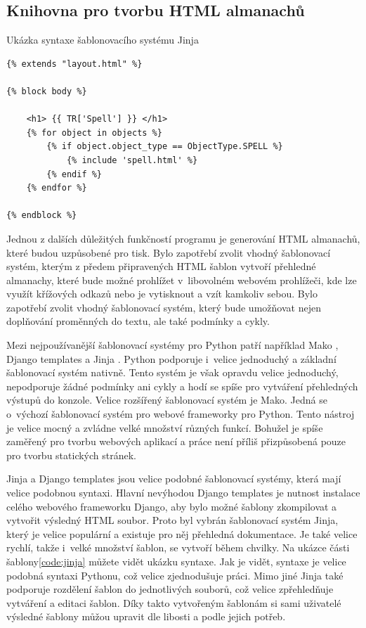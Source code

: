 \documentclass[thesis=B,czech]{resources/FITthesis}[2012/06/26]
\begin{document}
\subsection{Knihovna pro tvorbu HTML almanachů}
\begin{listing}[htbp]
\caption{\label{code:jinja}Ukázka syntaxe šablonovacího systému Jinja}
\begin{verbatim}
{% extends "layout.html" %}

{% block body %}

    <h1> {{ TR['Spell'] }} </h1>
    {% for object in objects %}
        {% if object.object_type == ObjectType.SPELL %}
            {% include 'spell.html' %}
        {% endif %}
    {% endfor %}
    
{% endblock %}

\end{verbatim}
\end{listing}
Jednou z dalších důležitých funkčností programu je generování HTML almanachů, které budou uzpůsobené pro tisk. Bylo zapotřebí zvolit vhodný šablonovací systém, kterým z předem připravených HTML šablon vytvoří přehledné almanachy, které bude možné prohlížet v~libovolném webovém prohlížeči, kde lze využít křížových odkazů nebo je vytisknout a vzít kamkoliv sebou. Bylo zapotřebí zvolit vhodný šablonovací systém, který bude umožňovat nejen doplňování proměnných do textu, ale také podmínky a cykly.\par

Mezi nejpoužívanější šablonovací systémy pro Python patří například Mako \cite{mako}, Django templates a Jinja \cite{jinja}. Python podporuje i~velice jednoduchý a základní šablonovací systém nativně. Tento systém je však opravdu velice jednoduchý, nepodporuje žádné podmínky ani cykly a hodí se spíše pro vytváření přehledných výstupů do konzole. Velice rozšířený šablonovací systém je Mako. Jedná se o~výchozí šablonovací systém pro webové frameworky pro Python. Tento nástroj je velice mocný a zvládne velké množství různých funkcí. Bohužel je spíše zaměřený pro tvorbu webových aplikací a práce není příliš přizpůsobená pouze pro tvorbu statických stránek.\par

Jinja a Django templates jsou velice podobné šablonovací systémy, která mají velice podobnou syntaxi. Hlavní nevýhodou Django templates je nutnost instalace celého webového frameworku Django, aby bylo možné šablony zkompilovat a vytvořit výsledný HTML soubor. Proto byl vybrán šablonovací systém Jinja, který je velice populární a existuje pro něj přehledná dokumentace. Je také velice rychlí, takže i~velké množství šablon, se vytvoří během chvilky. Na ukázce části šablony\ref{code:jinja} můžete vidět ukázku syntaxe. Jak je vidět, syntaxe je velice podobná syntaxi Pythonu, což velice zjednodušuje práci. Mimo jiné Jinja také podporuje rozdělení šablon do jednotlivých souborů, což velice zpřehledňuje vytváření a editaci šablon. Díky takto vytvořeným šablonám si sami uživatelé výsledné šablony můžou upravit dle libosti a podle jejich potřeb. 
\end{document}
